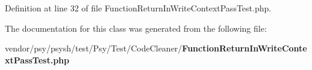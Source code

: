 Definition at line 32 of file Function\+Return\+In\+Write\+Context\+Pass\+Test.\+php.



The documentation for this class was generated from the following file\+:\begin{DoxyCompactItemize}
\item 
vendor/psy/psysh/test/\+Psy/\+Test/\+Code\+Cleaner/{\bf Function\+Return\+In\+Write\+Context\+Pass\+Test.\+php}\end{DoxyCompactItemize}
